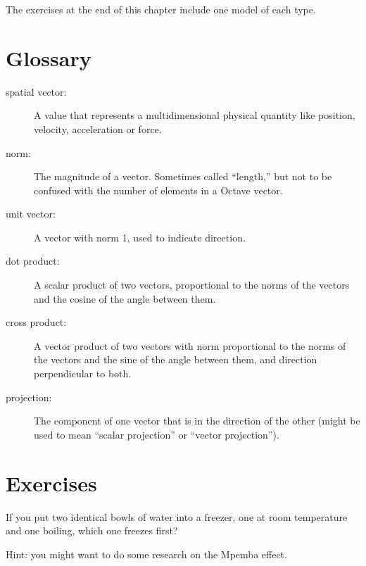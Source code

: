 \documentclass{book}
\begin{document}
The exercises at the end of this chapter include one model of
each type.


\section{Glossary}

\begin{description}

\item[spatial vector:] A value that represents a
multidimensional physical quantity like position, velocity,
acceleration or force.

\item[norm:] The magnitude of a vector. Sometimes called ``length,''
but not to be confused with the number of elements in a Octave
vector.

\item[unit vector:] A vector with norm 1, used to indicate
direction.

\item[dot product:] A scalar product of two vectors, proportional
to the norms of the vectors and the cosine of the angle between them.

\item[cross product:] A vector product of two vectors with norm
proportional to the norms of the vectors and the sine of the angle
between them, and direction perpendicular to both.

\item[projection:] The component of one vector that is in the
direction of the other (might be used to mean ``scalar projection'' or
``vector projection'').

\end{description}


\section{Exercises}

\begin{ex}
If you put two identical bowls of water into a freezer, one at
room temperature and one boiling, which one freezes first?

Hint: you might want to do some research on the Mpemba effect.

\end{ex}
\end{document}
